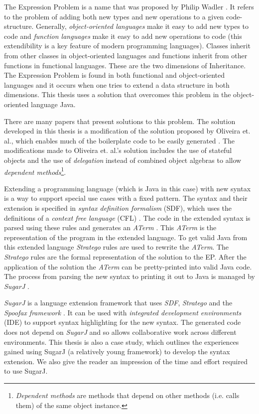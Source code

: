 \documentclass{report}
\begin{document}
The Expression Problem is a name that was proposed by Philip Wadler \cite{Wadler-Expression-1998}. It refers to the problem of adding both new types and new operations to a given code-structure. Generally, \emph{object-oriented languages} make it easy to add new types to code and \emph{function languages} make it easy to add new operations to code (this extendibility is a key feature of modern programming languages). Classes inherit from other classes in object-oriented languages and functions inherit from other functions in functional languages. These are the two dimensions of Inheritance. The Expression Problem is found in both functional and object-oriented languages and it occurs when one tries to extend a data structure in both dimensions. This thesis uses a solution that overcomes this problem in the object-oriented language Java.

There are many papers that present solutions to this problem. The solution developed in this thesis is a modification of the solution proposed by Oliveira et. al., which enables much of the boilerplate code to be  easily generated \cite{Oliv-Extensibility-2012}. The modifications made to Oliveira et. al.'s solution includes the use of stateful objects and the use of \emph{delegation} instead of combined object algebras to allow \emph{dependent methods}\footnote{\emph{Dependent methods} are methods that depend on other methods (i.e. calls them) of the same object instance.}.

Extending a programming language (which is Java in this case) with new syntax is a way to support special use cases with a fixed pattern. The syntax and their extension is specified in \emph{syntax definition formalism} (SDF), which uses the definitions of a \emph{context free language} (CFL) \cite{Heering-SDF-1989}. The code in the extended syntax is parsed using these rules and generates an \emph{ATerm} \cite{Brand-ATerms-2000}. This \emph{ATerm} is the representation of the program in the extended language. To get valid Java from this extended language \emph{Stratego} rules are used to rewrite the \emph{ATerm}. The \emph{Stratego} rules are the formal representation of the solution to the EP. After the application of the solution the \emph{ATerm} can be pretty-printed into valid Java code. The process from parsing the new syntax to printing it out to Java is managed by \emph{SugarJ} \cite{Erdweg-SugarJ-2011}.

\emph{SugarJ} is a language extension framework that uses \emph{SDF}, \emph{Stratego} and the \emph{Spoofax framework} \cite{Kats-Spoofax-2010}. It can be used with \emph{integrated development environments} (IDE) to support syntax highlighting for the new syntax. The generated code does not depend on \emph{SugarJ} and so allows collaborative work across different environments. This thesis is also a case study, which outlines the experiences gained using SugarJ (a relatively young framework) to develop the syntax extension. We also give the reader an impression of the time and effort required to use SugarJ.
\end{document}
